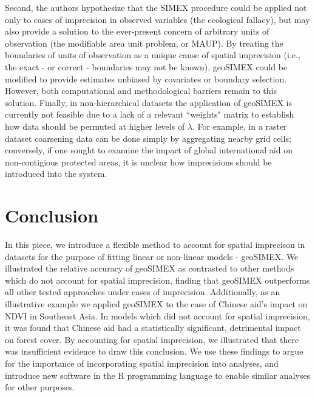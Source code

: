 Second, the authors hypothesize that the SIMEX procedure could be applied not only to cases of imprecision in observed variables (the ecological fallacy), but may also provide a solution to the ever-present concern of arbitrary units of observation (the modifiable area unit problem, or MAUP).
By treating the boundaries of units of observation as a unique cause of spatial imprecision (i.e., the exact - or correct - boundaries may not be known), geoSIMEX could be modified to provide estimates unbiased by covariates or boundary selection.
However, both computational and methodological barriers remain to this solution.
Finally, in non-hierarchical datasets the application of geoSIMEX is currently not feasible due to a lack of a relevant ``weights" matrix to establish how data should be permuted at higher levels of $\lambda$.
For example, in a raster dataset coarsening data can be done simply by aggregating nearby grid cells; conversely, if one sought to examine the impact of global international aid on non-contigious protected areas, it is unclear how imprecisions should be introduced into the system.


\newpage

\section{Conclusion}
In this piece, we introduce a flexible method to account for spatial imprecison in datasets for the purpose of fitting linear or non-linear models - geoSIMEX.
We illustrated the relative accuracy of geoSIMEX as contrasted to other methods which do not account for spatial imprecision, finding that geoSIMEX outperforms all other tested approaches under cases of imprecision.
Additionally, as an illustrative example we applied geoSIMEX to the case of Chinese aid's impact on NDVI in Southeast Asia.  
In models which did not account for spatial imprecision, it was found that Chinese aid had a statistically significant, detrimental impact on forest cover.
By accounting for spatial imprecision, we illustrated that there was insufficient evidence to draw this conclusion.
We use these findings to argue for the importance of incorporating spatial imprecision into analyses, and introduce new software in the R programming language to enable similar analyses for other purposes.
\newpage

